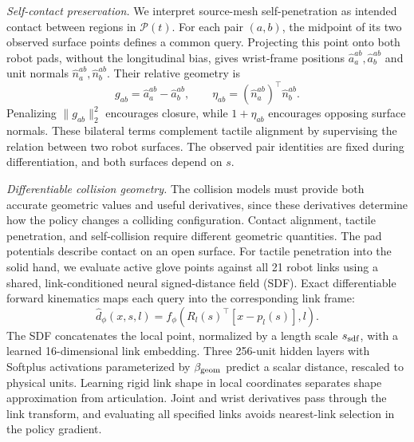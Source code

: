 \textit{Self-contact preservation.} We interpret source-mesh self-penetration as intended contact between regions in $\mathcal P(t)$. For each pair $(a,b)$, the midpoint of its two observed surface points defines a common query. Projecting this point onto both robot pads, without the longitudinal bias, gives wrist-frame positions $\hat a_a^{ab},\hat a_b^{ab}$ and unit normals $\hat n_a^{ab},\hat n_b^{ab}$. Their relative geometry is
\begin{equation}
    g_{ab}=\hat a_a^{ab}-\hat a_b^{ab},\qquad
    \eta_{ab}=(\hat n_a^{ab})^\top\hat n_b^{ab}.
    \label{eq:cart-self-contact}
\end{equation}
Penalizing $\|g_{ab}\|_2^2$ encourages closure, while $1+\eta_{ab}$ encourages opposing surface normals. These bilateral terms complement tactile alignment by supervising the relation between two robot surfaces. The observed pair identities are fixed during differentiation, and both surfaces depend on $s$.

\textit{Differentiable collision geometry.} The collision models must provide both accurate geometric values and useful derivatives, since these derivatives determine how the policy changes a colliding configuration. Contact alignment, tactile penetration, and self-collision require different geometric quantities. The pad potentials describe contact on an open surface. For tactile penetration into the solid hand, we evaluate active glove points against all 21 robot links using a shared, link-conditioned neural signed-distance field (SDF). Exact differentiable forward kinematics maps each query into the corresponding link frame:
\begin{equation}
    \hat d_\phi(x,s,l)=f_\phi\!\left(R_l(s)^\top[x-p_l(s)],l\right).
    \label{eq:cart-intrinsic-sdf}
\end{equation}
The SDF concatenates the local point, normalized by a length scale $s_{\rm sdf}$, with a learned 16-dimensional link embedding. Three 256-unit hidden layers with Softplus activations parameterized by $\beta_{\rm geom}$ predict a scalar distance, rescaled to physical units. Learning rigid link shape in local coordinates separates shape approximation from articulation. Joint and wrist derivatives pass through the link transform, and evaluating all specified links avoids nearest-link selection in the policy gradient.


